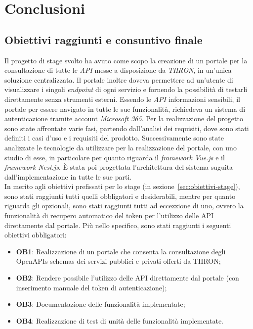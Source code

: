 \chapter{Conclusioni}\label{cap:conclusioni}


\section{Obiettivi raggiunti e consuntivo finale}
Il progetto di stage svolto ha avuto come scopo la creazione di un portale per la consultazione di tutte le \textit{API} messe a disposizione da \textit{THRON}, in un'unica soluzione centralizzata. 
Il portale inoltre doveva permettere ad un'utente di visualizzare i singoli \textit{endpoint} di ogni servizio e fornendo la possibilità di testarli direttamente senza strumenti esterni.
Essendo le \textit{API} informazioni sensibili, il portale per essere navigato in tutte le sue funzionalità, richiedeva un sistema di autenticazione tramite account \textit{Microsoft 365}.
Per la realizzazione del progetto sono state affrontate varie fasi, partendo dall'analisi dei requisiti, dove sono stati definiti i casi d'uso e i requisiti del prodotto.
Successivamente sono state analizzate le tecnologie da utilizzare per la realizzazione del portale, con uno studio di esse, in particolare per quanto riguarda il \textit{framework Vue.js} e il \textit{framework Nest.js}.
È stata poi progettata l'architettura del sistema suguita dall'implementazione in tutte le sue parti.\\

In merito agli obiettivi prefissati per lo stage (in sezione~\ref{sec:obiettivi-stage}), sono stati raggiunti tutti quelli obbligatori e desiderabili, mentre per quanto riguarda gli opzionali, sono stati raggiunti tutti ad eccezzione di uno, ovvero la funzionalità di recupero automatico del token per l'utilizzo delle API direttamente dal portale.
Più nello specifico, sono stati raggiunti i seguenti obiettivi obbligatori:
\begin{itemize}
  \item \textbf{OB1}: Realizzazione di un portale che consenta la consultazione degli OpenAPIs schemas dei servizi pubblici e privati offerti da THRON;
  \item \textbf{OB2}: Rendere possibile l'utilizzo delle API direttamente dal portale (con inserimento manuale del token di autenticazione);
  \item \textbf{OB3}: Documentazione delle funzionalità implementate;
  \item \textbf{OB4}: Realizzazione di test di unità delle funzionalità implementate.
\end{itemize}

